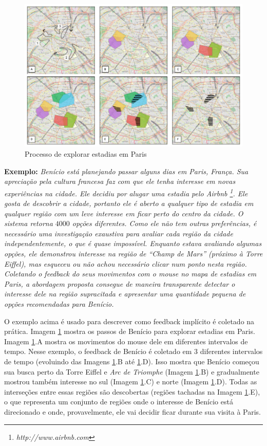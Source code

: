 \begin{figure}[t]
	\caption{Processo de explorar estadias em Paris}
	\label{fig:regions}
	\centering
	\includegraphics[width=\textwidth]{imagens/caso-de-estudo}
	\mfonte
\end{figure}

\textbf{Exemplo:} {\em Benício está planejando passar alguns dias em Paris, França. Sua apreciação pela cultura francesa faz com que ele tenha interesse em novas experiências na cidade. Ele decidiu por alugar uma estadia pelo Airbnb \footnote{\em http://www.airbnb.com}. Ele gosta de descobrir a cidade, portanto ele é aberto a qualquer tipo de estadia em qualquer região com um leve interesse em ficar perto do centro da cidade. O sistema retorna $4000$ opções diferentes. Como ele não tem outras preferências, é necessário uma investigação exaustiva para avaliar cada região da cidade independentemente, o que é quase impossível. Enquanto estava avaliando algumas opções, ele demonstrou interesse na região de  ``Champ de Mars'' (próximo à Torre Eiffel), mas esqueceu ou não achou necessário clicar num ponto nesta região. Coletando o feedback do seus movimentos com o mouse no mapa de estadias em Paris, a abordagem proposta consegue de maneira transparente detectar o interesse dele na região supracitada e apresentar uma quantidade pequena de opções recomendadas para Benício.}

O exemplo acima é usado para descrever como feedback implícito é coletado na prática. Imagem \ref{fig:regions} mostra os passos de Benício para explorar estadias em Paris. Imagem \ref{fig:regions}.A mostra os movimentos do mouse dele em diferentes intervalos de tempo. Nesse exemplo, o feedback de Benício é coletado em 3 diferentes intervalos de tempo (evoluindo das Imagens \ref{fig:regions}.B até \ref{fig:regions}.D). Isso mostra que Benício começou sua busca perto da Torre Eiffel e {\em Arc de Triomphe} (Imagem \ref{fig:regions}.B) e gradualmente mostrou também interesse no sul (Imagem \ref{fig:regions}.C) e norte (Imagem \ref{fig:regions}.D). Todas as interseções entre essas regiões são descobertas (regiões tachadas na Imagem \ref{fig:regions}.E), o que representa um conjunto de regiões onde o interesse de Benício está direcionado e onde, provavelmente, ele vai decidir ficar durante sua visita à Paris.

